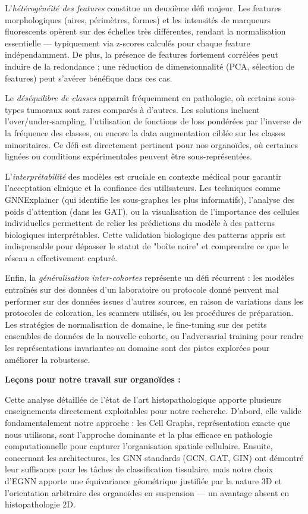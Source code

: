 L'\textit{hétérogénéité des features} constitue un deuxième défi majeur. Les features morphologiques (aires, périmètres, formes) et les intensités de marqueurs fluorescents opèrent sur des échelles très différentes, rendant la normalisation essentielle — typiquement via z-scores calculés pour chaque feature indépendamment. De plus, la présence de features fortement corrélées peut induire de la redondance ; une réduction de dimensionnalité (PCA, sélection de features) peut s'avérer bénéfique dans ces cas.

Le \textit{déséquilibre de classes} apparaît fréquemment en pathologie, où certains sous-types tumoraux sont rares comparés à d'autres. Les solutions incluent l'over/under-sampling, l'utilisation de fonctions de loss pondérées par l'inverse de la fréquence des classes, ou encore la data augmentation ciblée sur les classes minoritaires. Ce défi est directement pertinent pour nos organoïdes, où certaines lignées ou conditions expérimentales peuvent être sous-représentées.

L'\textit{interprétabilité} des modèles est cruciale en contexte médical pour garantir l'acceptation clinique et la confiance des utilisateurs. Les techniques comme GNNExplainer (qui identifie les sous-graphes les plus informatifs), l'analyse des poids d'attention (dans les GAT), ou la visualisation de l'importance des cellules individuelles permettent de relier les prédictions du modèle à des patterns biologiques interprétables. Cette validation biologique des patterns appris est indispensable pour dépasser le statut de "boîte noire" et comprendre ce que le réseau a effectivement capturé.

Enfin, la \textit{généralisation inter-cohortes} représente un défi récurrent : les modèles entraînés sur des données d'un laboratoire ou protocole donné peuvent mal performer sur des données issues d'autres sources, en raison de variations dans les protocoles de coloration, les scanners utilisés, ou les procédures de préparation. Les stratégies de normalisation de domaine, le fine-tuning sur des petits ensembles de données de la nouvelle cohorte, ou l'adversarial training pour rendre les représentations invariantes au domaine sont des pistes explorées pour améliorer la robustesse.

\textbf{Leçons pour notre travail sur organoïdes :}

Cette analyse détaillée de l'état de l'art histopathologique apporte plusieurs enseignements directement exploitables pour notre recherche. D'abord, elle valide fondamentalement notre approche : les Cell Graphs, représentation exacte que nous utilisons, sont l'approche dominante et la plus efficace en pathologie computationnelle pour capturer l'organisation spatiale cellulaire. Ensuite, concernant les architectures, les GNN standards (GCN, GAT, GIN) ont démontré leur suffisance pour les tâches de classification tissulaire, mais notre choix d'EGNN apporte une équivariance géométrique justifiée par la nature 3D et l'orientation arbitraire des organoïdes en suspension — un avantage absent en histopathologie 2D.

